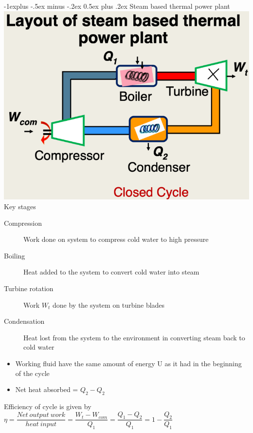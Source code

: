 \documentclass{article}
\makeatletter
\renewcommand{\subsection}{\@startsection{subsection}{2}{0mm}%
    {-1explus -.5ex minus -.2ex}%
    {0.5ex plus .2ex}%
{\normalfont\normalsize\bfseries}}
\makeatother
\begin{document}
\begin{multicols*}{4}
\subsection{Steam based thermal power plant}
\includegraphics[scale=0.25]{boiler_system}\\
Key stages
\begin{description}
	\item[Compression]{Work done on system to compress cold water to high pressure}
	\item[Boiling]{Heat added to the system to convert cold water into steam}
	\item[Turbine rotation]{Work $W_{t}$ done by the system on turbine blades}
	\item[Condensation]{Heat lost from the system to the environment in converting steam back to cold water}
\end{description}
\begin{itemize}
	\item Working fluid have the same amount of energy U as it had in the beginning of the cycle
	\item Net heat absorbed = $Q_{2} - Q_{2}$
\end{itemize}
Efficiency of cycle is given by \\
$\eta = \dfrac{Net~output~work}{heat~input} = \dfrac{W_{t} - W_{com}}{Q_{1}} = \dfrac{Q_{1}-Q_{2}}{Q_{1}} = 1-\dfrac{Q_{2}}{Q_{1}}$


\end{multicols*}
\end{document}
